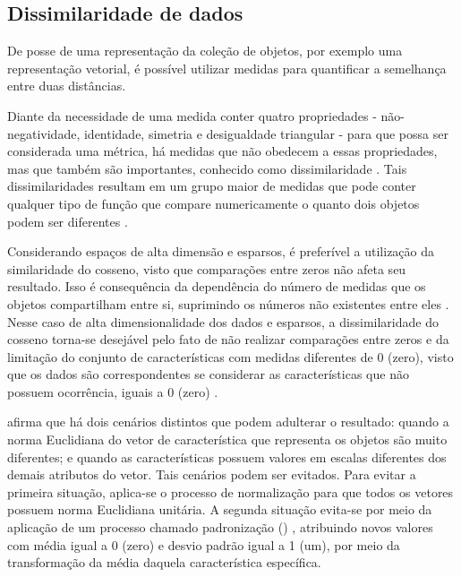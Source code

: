 		\subsection{Dissimilaridade de dados}
		\label{subsec:dissimilaridade}
			De posse de uma representação da coleção de objetos, por exemplo uma representação
			vetorial, é possível utilizar medidas para quantificar a semelhança entre duas
			distâncias.
		
			Diante da necessidade de uma medida conter quatro propriedades - não-negatividade,
			identidade, simetria e desigualdade triangular - para que possa ser considerada
			uma métrica, há medidas que não obedecem a essas propriedades, mas que também
			são importantes, conhecido como dissimilaridade \cite{phd:paulovich}. Tais
			dissimilaridades resultam em um grupo maior de medidas que pode conter qualquer
			tipo de função que compare numericamente o quanto dois objetos podem ser
			diferentes \cite{Tan:2005:IDM:1095618}.
			
			Considerando espaços de alta dimensão e esparsos, é preferível a utilização da
			similaridade do cosseno, visto que comparações entre zeros não afeta
			seu resultado. Isso é consequência da dependência do número de medidas que os
			objetos compartilham entre si, suprimindo os números não existentes entre
			eles \cite{phd:paulovich}. Nesse caso de alta dimensionalidade dos dados e
			esparsos, a dissimilaridade do cosseno torna-se desejável pelo fato de não
			realizar comparações entre zeros e da limitação do conjunto de características
			com medidas diferentes de 0 (zero), visto que os dados são correspondentes se
			considerar as características que não possuem ocorrência, iguais a $0$
			(zero) \cite{Tan:2005:IDM:1095618}.
			
			 afirma que há dois cenários distintos que podem
			adulterar o resultado: quando a norma Euclidiana do vetor de característica
			que representa os objetos são muito diferentes; e quando as características
			possuem valores em escalas diferentes dos demais
			atributos do vetor. Tais cenários podem ser evitados. Para evitar a primeira
			situação, aplica-se o processo de normalização para que todos os vetores possuem
			norma Euclidiana unitária. A segunda situação evita-se por meio da
			aplicação de um processo chamado padronização ()
			\cite{Tan:2005:IDM:1095618}, atribuindo novos valores com média igual a 0 (zero)
			e desvio padrão igual a 1 (um), por meio da transformação da média daquela
			característica específica.
			
